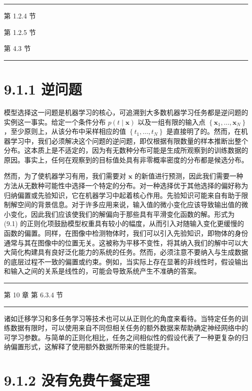 \documentclass[10pt]{report}
\newcommand{\HRule}{\begin{center}\rule{0.9\linewidth}{0.2mm}\end{center}}
\begin{document}
\HRule

第 1.2.4 节

第 1.2.5 节

第 4.3 节

\HRule

\section*{9.1.1 逆问题}

模型选择这一问题是机器学习的核心，可追溯到大多数机器学习任务都是逆问题的实例这一事实。给定一个条件分布 \(p\left( {t \mid  \mathbf{x}}\right)\) 以及一组有限的输入点 \(\left\{  {{\mathbf{x}}_{1},\ldots ,{\mathbf{x}}_{N}}\right\}\) ，至少原则上，从该分布中采样相应的值 \(\left\{  {{t}_{1},\ldots ,{t}_{N}}\right\}\) 是直接明了的。然而，在机器学习中，我们必须解决这个问题的逆问题，即仅根据有限数量的样本推断出整个分布。这本质上是不适定的，因为有无数种分布可能是生成所观察到的训练数据的原因。事实上，任何在观察到的目标值处具有非零概率密度的分布都是候选分布。

然而，为了使机器学习有用，我们需要对 \(\mathbf{x}\) 的新值进行预测，因此我们需要一种方法从无数种可能性中选择一个特定的分布。对一种选择优于其他选择的偏好称为归纳偏置或先验知识，它在机器学习中起着核心作用。先验知识可能来自有助于限制解空间的背景信息。对于许多应用来说，输入值的微小变化应该导致输出值的微小变化，因此我们应该使我们的解偏向于那些具有平滑变化函数的解。形式为 (9.1) 的正则化项鼓励模型权重具有较小的幅度，从而引入对随输入变化更缓慢的函数的偏置。同样，在图像中检测物体时，我们可以引入先验知识，即物体的身份通常与其在图像中的位置无关。这被称为平移不变性，将其纳入我们的解中可以大大简化构建具有良好泛化能力的系统的任务。然而，必须注意不要纳入与生成数据的底层过程不一致的偏置或约束。例如，当实际上存在显著的非线性时，假设输出和输入之间的关系是线性的，可能会导致系统产生不准确的答案。

\HRule

第 10 章 第 6.3.4 节

\HRule

诸如迁移学习和多任务学习等技术也可以从正则化的角度来看待。当特定任务的训练数据有限时，可以使用来自不同但相关任务的额外数据来帮助确定神经网络中的可学习参数。与简单的正则化相比，任务之间相似性的假设代表了一种更复杂的归纳偏置形式，这解释了使用额外数据所带来的性能提升。

\section*{9.1.2 没有免费午餐定理}
\end{document}
